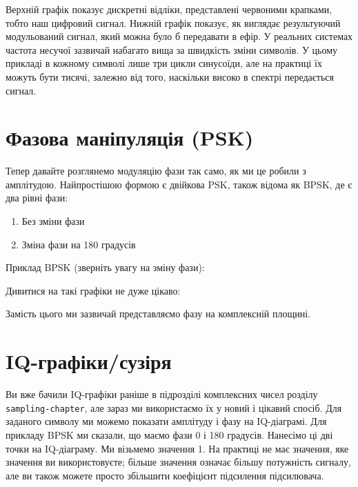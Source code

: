 \href{../_images/ask3.svg}{}

Верхній графік показує дискретні відліки, представлені червоними
крапками, тобто наш цифровий сигнал. Нижній графік показує, як виглядає
результуючий модульований сигнал, який можна було б передавати в ефір. У
реальних системах частота несучої зазвичай набагато вища за швидкість
зміни символів. У цьому прикладі в кожному символі лише три цикли
синусоїди, але на практиці їх можуть бути тисячі, залежно від того,
наскільки високо в спектрі передається сигнал.

\section{Фазова маніпуляція
(PSK)}\label{ux444ux430ux437ux43eux432ux430-ux43cux430ux43dux456ux43fux443ux43bux44fux446ux456ux44f-psk}

Тепер давайте розглянемо модуляцію фази так само, як ми це робили з
амплітудою. Найпростішою формою є двійкова PSK, також відома як BPSK, де
є два рівні фази:

\begin{enumerate}
\def\labelenumi{\arabic{enumi}.}
\tightlist
\item
  Без зміни фази
\item
  Зміна фази на 180 градусів
\end{enumerate}

Приклад BPSK (зверніть увагу на зміну фази):

\href{../_images/bpsk.svg}{}

Дивитися на такі графіки не дуже цікаво:

\href{../_images/bpsk2.svg}{}

Замість цього ми зазвичай представляємо фазу на комплексній площині.

\section{IQ-графіки/сузір\textquotesingle я}\label{iq-ux433ux440ux430ux444ux456ux43aux438ux441ux443ux437ux456ux440ux44f}

Ви вже бачили IQ-графіки раніше в підрозділі комплексних чисел розділу
\texttt{sampling-chapter}, але зараз ми використаємо їх у новий і
цікавий спосіб. Для заданого символу ми можемо показати амплітуду і фазу
на IQ-діаграмі. Для прикладу BPSK ми сказали, що маємо фази 0 і 180
градусів. Нанесімо ці дві точки на IQ-діаграму. Ми візьмемо значення 1.
На практиці не має значення, яке значення ви використовуєте; більше
значення означає більшу потужність сигналу, але ви також можете просто
збільшити коефіцієнт підсилення підсилювача.

